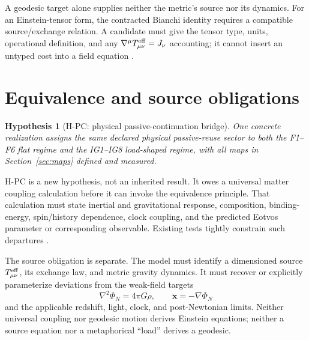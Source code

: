 \documentclass[11pt,a4paper]{article}
\newtheorem{hypothesis}[definition]{Hypothesis}
\theoremstyle{remark}
\begin{document}
A geodesic target alone supplies neither the metric's source nor its dynamics.
For an Einstein-tensor form, the contracted Bianchi identity requires a
compatible source/exchange relation. A candidate must give the tensor type,
units, operational definition, and any $\nabla^\mu T^{\rm eff}_{\mu\nu}=J_\nu$
accounting; it cannot insert an untyped cost into a field equation
\citep{einstein1916,brading2005,szabados2009}.

\section{Equivalence and source obligations}\label{sec:obligations}
\begin{hypothesis}[H-PC: physical passive-continuation bridge]\label{hyp:bridge}
One concrete realization assigns the same declared physical passive-reuse
sector to both the F1--F6 flat regime and the IG1--IG8 load-shaped regime, with
all maps in Section~\ref{sec:maps} defined and measured.
\end{hypothesis}

H-PC is a new hypothesis, not an inherited result. It owes a universal matter
coupling calculation before it can invoke the equivalence principle. That
calculation must state inertial and gravitational response, composition,
binding-energy, spin/history dependence, clock coupling, and the predicted
Eotvos parameter or corresponding observable. Existing tests tightly constrain
such departures \citep{will2014,wagner2012,touboul2022}.

The source obligation is separate. The model must identify a dimensioned source
$T^{\rm eff}_{\mu\nu}$, its exchange law, and metric gravity dynamics. It must
recover or explicitly parameterize deviations from the weak-field targets
\[
 \nabla^2\Phi_N=4\pi G\rho,\qquad \ddot{\mathbf x}=-\nabla\Phi_N
\]
and the applicable redshift, light, clock, and post-Newtonian limits. Neither
universal coupling nor geodesic motion derives Einstein equations;
neither a source equation nor a metaphorical ``load'' derives a geodesic.
\end{document}
